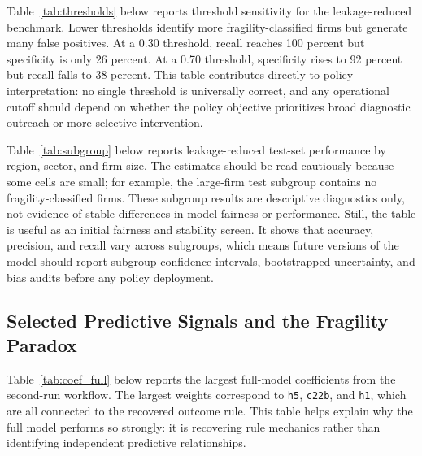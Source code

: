 Table~\ref{tab:thresholds} below reports threshold sensitivity for the leakage-reduced benchmark. Lower thresholds identify more fragility-classified firms but generate many false positives. At a 0.30 threshold, recall reaches 100 percent but specificity is only 26 percent. At a 0.70 threshold, specificity rises to 92 percent but recall falls to 38 percent. This table contributes directly to policy interpretation: no single threshold is universally correct, and any operational cutoff should depend on whether the policy objective prioritizes broad diagnostic outreach or more selective intervention.

\begin{table}[H]
\centering
\caption{Leakage-Reduced Threshold Sensitivity}
\label{tab:thresholds}
\resizebox{\textwidth}{!}{}
\end{table}

Table~\ref{tab:subgroup} below reports leakage-reduced test-set performance by region, sector, and firm size. The estimates should be read cautiously because some cells are small; for example, the large-firm test subgroup contains no fragility-classified firms. These subgroup results are descriptive diagnostics only, not evidence of stable differences in model fairness or performance. Still, the table is useful as an initial fairness and stability screen. It shows that accuracy, precision, and recall vary across subgroups, which means future versions of the model should report subgroup confidence intervals, bootstrapped uncertainty, and bias audits before any policy deployment.

\begin{table}[H]
\centering
\caption{Leakage-Reduced Subgroup Performance}
\label{tab:subgroup}
\resizebox{\textwidth}{!}{}
\end{table}

\subsection{Selected Predictive Signals and the Fragility Paradox}

Table~\ref{tab:coef_full} below reports the largest full-model coefficients from the second-run workflow. The largest weights correspond to \texttt{h5}, \texttt{c22b}, and \texttt{h1}, which are all connected to the recovered outcome rule. This table helps explain why the full model performs so strongly: it is recovering rule mechanics rather than identifying independent predictive relationships.

